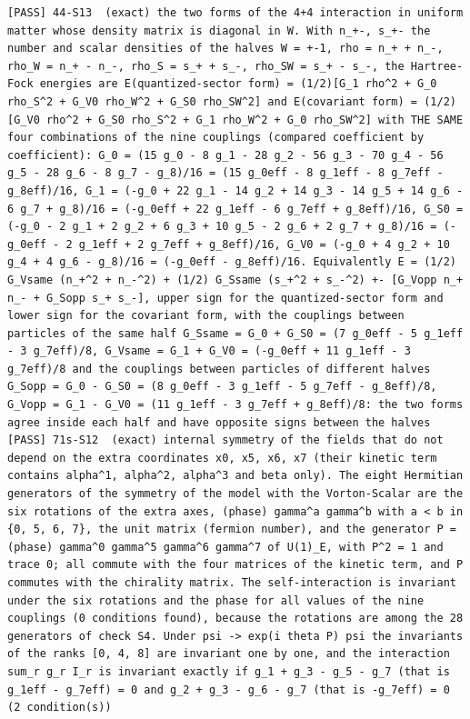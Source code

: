 \documentclass[
  10pt,
]{article}
\begin{document}
\begin{verbatim}
[PASS] 44-S13  (exact) the two forms of the 4+4 interaction in uniform matter whose density matrix is diagonal in W. With n_+-, s_+- the number and scalar densities of the halves W = +-1, rho = n_+ + n_-, rho_W = n_+ - n_-, rho_S = s_+ + s_-, rho_SW = s_+ - s_-, the Hartree-Fock energies are E(quantized-sector form) = (1/2)[G_1 rho^2 + G_0 rho_S^2 + G_V0 rho_W^2 + G_S0 rho_SW^2] and E(covariant form) = (1/2)[G_V0 rho^2 + G_S0 rho_S^2 + G_1 rho_W^2 + G_0 rho_SW^2] with THE SAME four combinations of the nine couplings (compared coefficient by coefficient): G_0 = (15 g_0 - 8 g_1 - 28 g_2 - 56 g_3 - 70 g_4 - 56 g_5 - 28 g_6 - 8 g_7 - g_8)/16 = (15 g_0eff - 8 g_1eff - 8 g_7eff - g_8eff)/16, G_1 = (-g_0 + 22 g_1 - 14 g_2 + 14 g_3 - 14 g_5 + 14 g_6 - 6 g_7 + g_8)/16 = (-g_0eff + 22 g_1eff - 6 g_7eff + g_8eff)/16, G_S0 = (-g_0 - 2 g_1 + 2 g_2 + 6 g_3 + 10 g_5 - 2 g_6 + 2 g_7 + g_8)/16 = (-g_0eff - 2 g_1eff + 2 g_7eff + g_8eff)/16, G_V0 = (-g_0 + 4 g_2 + 10 g_4 + 4 g_6 - g_8)/16 = (-g_0eff - g_8eff)/16. Equivalently E = (1/2) G_Vsame (n_+^2 + n_-^2) + (1/2) G_Ssame (s_+^2 + s_-^2) +- [G_Vopp n_+ n_- + G_Sopp s_+ s_-], upper sign for the quantized-sector form and lower sign for the covariant form, with the couplings between particles of the same half G_Ssame = G_0 + G_S0 = (7 g_0eff - 5 g_1eff - 3 g_7eff)/8, G_Vsame = G_1 + G_V0 = (-g_0eff + 11 g_1eff - 3 g_7eff)/8 and the couplings between particles of different halves G_Sopp = G_0 - G_S0 = (8 g_0eff - 3 g_1eff - 5 g_7eff - g_8eff)/8, G_Vopp = G_1 - G_V0 = (11 g_1eff - 3 g_7eff + g_8eff)/8: the two forms agree inside each half and have opposite signs between the halves
[PASS] 71s-S12  (exact) internal symmetry of the fields that do not depend on the extra coordinates x0, x5, x6, x7 (their kinetic term contains alpha^1, alpha^2, alpha^3 and beta only). The eight Hermitian generators of the symmetry of the model with the Vorton-Scalar are the six rotations of the extra axes, (phase) gamma^a gamma^b with a < b in {0, 5, 6, 7}, the unit matrix (fermion number), and the generator P = (phase) gamma^0 gamma^5 gamma^6 gamma^7 of U(1)_E, with P^2 = 1 and trace 0; all commute with the four matrices of the kinetic term, and P commutes with the chirality matrix. The self-interaction is invariant under the six rotations and the phase for all values of the nine couplings (0 conditions found), because the rotations are among the 28 generators of check S4. Under psi -> exp(i theta P) psi the invariants of the ranks [0, 4, 8] are invariant one by one, and the interaction sum_r g_r I_r is invariant exactly if g_1 + g_3 - g_5 - g_7 (that is g_1eff - g_7eff) = 0 and g_2 + g_3 - g_6 - g_7 (that is -g_7eff) = 0 (2 condition(s))

\end{verbatim}
\end{document}
